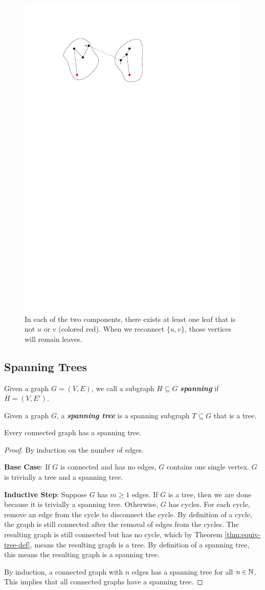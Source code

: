 \begin{figure}[htbp]
    \centering
    \includegraphics[width=0.4\linewidth]{figures/pendant-vertex-cycle.pdf}
    \caption{In each of the two components, there exists at least one leaf that is not $u$ or $v$ (colored red). When we reconnect $\{u,v\}$, those vertices will remain leaves.}
    \label{fig:pendant-vertex}
\end{figure}

\subsection{Spanning Trees}

\begin{definition}
    Given a graph $G = (V,E)$, we call a subgraph $H \subseteq G$ \textit{\textbf{spanning}} if $H = (V,E')$.
\end{definition}

\begin{definition}
    Given a graph $G$, a \textit{\textbf{spanning tree}} is a spanning subgraph $T \subseteq G$ that is a tree.
\end{definition}

\begin{theorem}
    Every connected graph has a spanning tree.
\end{theorem}

\begin{proof}
    By induction on the number of edges.

    \textbf{Base Case}: If $G$ is connected and has no edges, $G$ contains one single vertex. $G$ is trivially a tree and a spanning tree.

    \textbf{Inductive Step}: Suppose $G$ has $m \geq 1$ edges. If $G$ is a tree, then we are done because it is trivially a spanning tree. Otherwise, $G$ has cycles. For each cycle, remove an edge from the cycle to disconnect the cycle. By definition of a cycle, the graph is still connected after the removal of edges from the cycles. The resulting graph is still connected but has no cycle, which by Theorem \ref{thm:equiv-tree-def}, means the resulting graph is a tree. By definition of a spanning tree, this means the resulting graph is a spanning tree.

    By induction, a connected graph with $n$ edges has a spanning tree for all $n \in \mathbb{N}$. This implies that all connected graphs have a spanning tree.
\end{proof}

